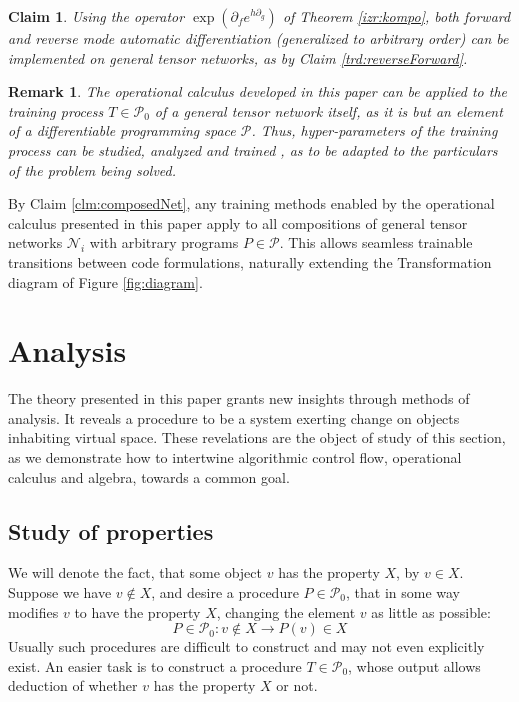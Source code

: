 \documentclass[preprint,12pt]{elsarticle}
\newcommand{\NN}{\mathcal{N}}
\newcommand{\dP}{\mathcal{P}}
\newcommand{\D}{\partial}
\newtheorem{trditev}{Claim}[section]
\newtheorem{opomba}{Remark}[section]
\begin{document}
\begin{trditev}
Using the operator $\exp(\D_fe^{h\D_g})$ of Theorem \ref{izr:kompo}, both forward \cite{PcAD} and reverse \cite{ReverseAD} mode automatic differentiation (generalized to arbitrary order) can be implemented on general tensor networks, as by Claim \ref{trd:reverseForward}.
\end{trditev}

\begin{opomba}
The operational calculus developed in this paper can be applied to the training process $T\in\dP_0$ of a general tensor network itself, as it is but an element of a differentiable programming space $\dP$. Thus, hyper-parameters of the training process \cite{HyperParams} can be studied, analyzed and trained \cite{hyper}, as to be adapted to the particulars of the problem being solved.
\end{opomba}

By Claim \ref{clm:composedNet}, any training methods enabled by the operational calculus presented in this paper apply to all compositions of general tensor networks $\NN_i$ with arbitrary programs $P\in\dP$. This allows seamless trainable transitions between code formulations, naturally extending the Transformation diagram of Figure \ref{fig:diagram}. 
  
\section{Analysis}\label{sec:Analysis}
  
   The theory presented in this paper grants new insights through methods of analysis. It reveals a procedure to be a system exerting change on objects inhabiting virtual space. These revelations are the object of study of this section, as we demonstrate how to intertwine algorithmic control flow, operational calculus and algebra, towards a common goal.  
  
  \subsection{Study of properties}\label{sec:studyProperties}
  
  We will denote the fact, that some object $v$ has the property $X$, by $v\in
  X$. Suppose we have $v\notin X$, and desire a procedure $P\in\dP_0$, that in
  some way modifies $v$ to have the property $X$, changing the element $v$ as
  little as possible: 
  \begin{equation}\label{eq:procP}
  P\in \dP_0:v\notin X\to P(v)\in X
  \end{equation}
  Usually such procedures are difficult to construct and may not even explicitly
  exist. An easier task is to construct a procedure $T\in\dP_0$, whose output
  allows deduction of whether $v$ has the property $X$ or not. 
  
\end{document}
